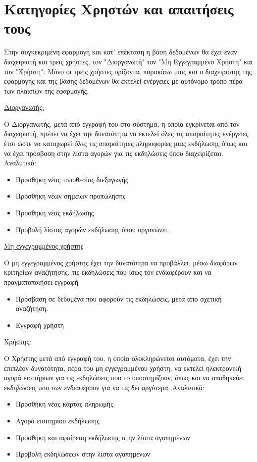 ﻿
\section{Κατηγορίες Χρηστών και απαιτήσεις τους}

Στην συγκεκριμένη εφαρμογή και κατ' επέκταση η βάση δεδομένων θα έχει
έναν διαχειριστή και τρεις χρήστες, τον "Διοργανωτή" τον "Μη
Εγγεγραμμένο Χρήστη" και τον "Χρήστη". Μόνο οι τρεις χρήστες ορίζονται
παρακάτω μιας και ο διαχειριστής της εφαρμογής και της βάσης δεδομένων
θα εκτελεί ενέργειες με αυτόνομο τρόπο πέρα των πλαισίων της
εφαρμογής.

\underline{Διοργανωτής:}

Ο Διοργανωτής, μετά από εγγραφή του στο σύστημα, η οποία εγκρίνεται
από τον διαχειριστή, πρέπει να έχει την δυνατότητα να εκτελεί όλες τις
απαραίτητες ενέργειες έτσι ώστε να καταχωρεί όλες τις απαραίτητες
πληροφορίες μιας εκδήλωσης όπως και να έχει πρόσβαση στην λίστα αγορών
για τις εκδηλώσεις όπου διαχειρίζεται. Αναλυτικά:
\begin{itemize}[noitemsep]
\item Προσθήκη νέας τοποθεσίας διεξαγωγής
\item Προσθήκη νέων σημείων προπώλησης
\item Προσθηκη νέας εκδήλωσης
\item Προβολή λίστας αγορών εκδήλωσης όπου οργανώνει
\end{itemize}

\underline{Μη εγγεγραμμένος χρήστης}

Ο μη εγγεγραμμένος χρήστης έχει την δυνατότητα να προβάλλει, μέσω διαφόρων
κριτηρίων αναζήτησης, τις εκδηλώσεις που ίσως τον ενδιαφέρουν και να πραγματοποιήσει
εγγραφή
\begin{itemize}[noitemsep]
\item Πρόσβαση σε δεδομένα που αφορούν τις εκδηλώσεις, μετά απο
  σχετική αναζήτηση.
\item Εγγραφή χρήστη
\end{itemize}

\underline{Χρήστης:}

Ο Χρήστης μετά από εγγραφή του, η οποία ολοκληρώνεται αυτόματα, έχει
την επιπλέον δυνατότητα, πέρα του μη εγγεγραμμένου χρήστη, να εκτελεί ηλεκτρονική
αγορά εισιτήριων για τις εκδηλώσεις που το υποστηρίζουν, όπως και να
αποθηκεύει εκδηλώσεις που των ενδιαφέρουν για να τις δει
αργότερα. Αναλυτικά:
\begin{itemize}[noitemsep]
\item Προσθήκη νέας κάρτας πληρωμής
\item Αγορά εισιτηρίου εκδήλωσης
\item Προσθήκη και αφαίρεση εκδήλωσης στην λίστα αγαπημένων
\item Προβολή εκδηλώσεων στην λίστα αγαπημένων
\end{itemize}


